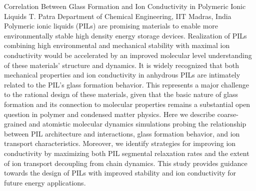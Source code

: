 
    \begin{abstract_online}{Correlation Between Glass Formation and Ion Conductivity in Polymeric Ionic Liquids }{%
        T. Patra}{%
        \IStag}{%
        Department of Chemical Engineering, IIT Madras, India}
    Polymeric ionic liquids (PILs) are promising materials to enable more environmentally stable high density energy storage devices. Realization of PILs combining high environmental and mechanical stability with maximal ion conductivity would be accelerated by an improved molecular level understanding of these materials’ structure and dynamics. It is widely recognized that both mechanical properties and ion conductivity in anhydrous PILs are intimately related to the PIL’s glass formation behavior. This represents a major challenge to the rational design of these materials, given that the basic nature of glass formation and its connection to molecular properties remains a substantial open question in polymer and condensed matter physics. Here we describe coarse-grained and atomistic molecular dynamics simulations probing the relationship between PIL architecture and interactions, glass formation behavior, and ion transport characteristics. Moreover, we identify strategies for improving ion conductivity by maximizing both PIL segmental relaxation rates and the extent of ion transport decoupling from chain dynamics. This study provides guidance towards the design of PILs with improved stability and ion conductivity for future energy applications. 
    
    \end{abstract_online}
    